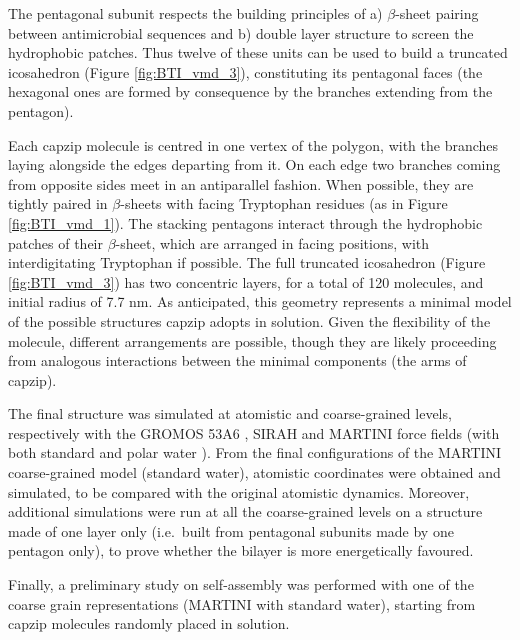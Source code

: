 The pentagonal subunit respects the building principles of a) $\beta$-sheet pairing between antimicrobial sequences and b) double layer structure to screen the hydrophobic patches. Thus twelve of these units can be used to build a truncated icosahedron (Figure \ref{fig:BTI_vmd_3}), constituting its pentagonal faces (the hexagonal ones are formed by consequence by the branches extending from the pentagon).

Each capzip molecule is centred in one vertex of the polygon, with the branches laying alongside the edges departing from it. On each edge two branches coming from opposite sides meet in an antiparallel fashion. When possible, they are tightly paired in $\beta$-sheets with facing Tryptophan residues (as in Figure \ref{fig:BTI_vmd_1}). The stacking pentagons interact through the hydrophobic patches of their $\beta$-sheet, which are arranged in facing positions, with interdigitating Tryptophan if possible.
%
The full truncated icosahedron (Figure \ref{fig:BTI_vmd_3}) has two concentric layers, for a total of 120 molecules, and initial radius of 7.7 nm.
%
As anticipated, this geometry represents a minimal model of the possible structures capzip adopts in solution. Given the flexibility of the molecule, different arrangements are possible, though they are likely proceeding from analogous interactions between the minimal components (the arms of capzip).

The final structure was simulated at atomistic and coarse-grained levels, respectively with the GROMOS 53A6 \citep{Oostenbrink2004}, SIRAH \citep{Machado2018} and MARTINI \citep{Marrink2007, Monticelli2008} force fields (with both standard and polar water \citep{Yesylevskyy2010}).
From the final configurations of the MARTINI coarse-grained model (standard water), atomistic coordinates were obtained and simulated, to be compared with the original atomistic dynamics.
%
Moreover, additional simulations were run at all the coarse-grained levels on a structure made of one layer only (i.e.\ built from pentagonal subunits made by one pentagon only), to prove whether the bilayer is more energetically favoured.

Finally, a preliminary study on self-assembly was performed with one of the coarse grain representations (MARTINI with standard water), starting from capzip molecules randomly placed in solution.

